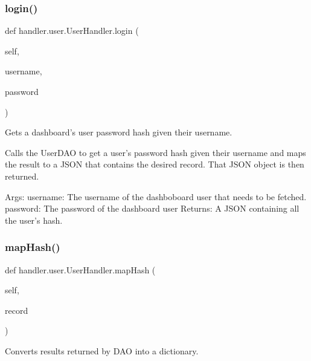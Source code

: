 \subsubsection{\texorpdfstring{login()}{login()}}
{\footnotesize\ttfamily def handler.\+user.\+User\+Handler.\+login (\begin{DoxyParamCaption}\item[{}]{self,  }\item[{}]{username,  }\item[{}]{password }\end{DoxyParamCaption})}

\begin{DoxyVerb}Gets a dashboard's user password hash given their username.

Calls the UserDAO to get a user's password hash given their username 
and maps the result to a JSON that contains the desired record. 
That JSON object is then returned.

Args:
    username: The username of the dashboboard user that needs to be fetched.
    password: The password of the dashboard user
Returns:
    A JSON containing all the user's hash.
\end{DoxyVerb}
 \mbox{\label{classhandler_1_1user_1_1_user_handler_a6bebccaf5fa86ff02d81c65bff29ec87}} 
\subsubsection{\texorpdfstring{map\+Hash()}{mapHash()}}
{\footnotesize\ttfamily def handler.\+user.\+User\+Handler.\+map\+Hash (\begin{DoxyParamCaption}\item[{}]{self,  }\item[{}]{record }\end{DoxyParamCaption})}

\begin{DoxyVerb}Converts results returned by DAO into a dictionary.
\end{DoxyVerb}
 \mbox{\label{classhandler_1_1user_1_1_user_handler_a68a4fcf8939d84849aa4b6bb63d25a65}} 

